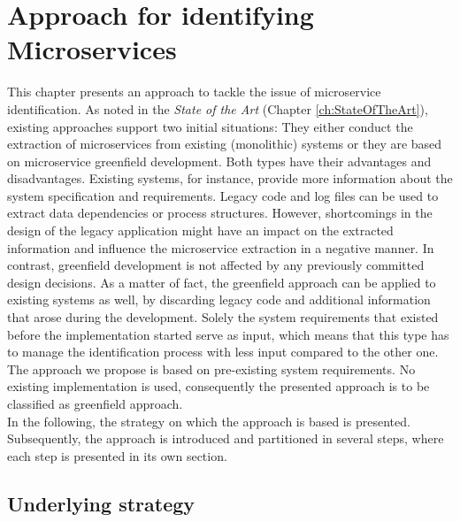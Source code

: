 \chapter{Approach for identifying Microservices}
\label{ch:Solution}
This chapter presents an approach to tackle the issue of microservice identification. 
As noted in the \textit{State of the Art} (Chapter \ref{ch:StateOfTheArt}), existing approaches support two initial situations: They either conduct the extraction of microservices from existing (monolithic) systems or they are based on microservice greenfield development. Both types have their advantages and disadvantages. Existing systems, for instance, provide more information about the system specification and requirements. Legacy code and log files can be used to extract data dependencies or process structures. However, shortcomings in the design of the legacy application might have an impact on the extracted information and influence the microservice extraction in a negative manner. In contrast, greenfield development is not affected by any previously committed design decisions. As a matter of fact, the greenfield approach can be applied to existing systems as well, by discarding legacy code and additional information that arose during the development. Solely the system requirements that existed before the implementation started serve as input, which means that this type has to manage the identification process with less input compared to the other one.\\
The approach we propose is based on pre-existing system requirements. No existing implementation is used, consequently the presented approach is to be classified as greenfield approach.\\
In the following, the strategy on which the approach is based is presented. Subsequently, the approach is introduced and partitioned in several steps, where each step is presented in its own section.



\section{Underlying strategy}

